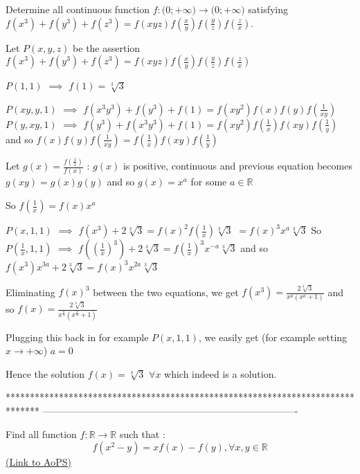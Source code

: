 \begin{solution}
	\begin{tcolorbox}Determine all continuous function ${{f: \mathbb(0;+\infty)}\to\mathbb(0;+\infty)}$ satisfying $f(x^3)+f(y^3)+f(z^3)=f(xyz)f(\frac{x}{y})f(\frac{y}{z})f(\frac{z}{x})$.\end{tcolorbox}
Let $P(x,y,z)$ be the assertion $f(x^3)+f(y^3)+f(z^3)=f(xyz)f(\frac xy)f(\frac yz)f(\frac zx)$

$P(1,1)$ $\implies$ $f(1)=\sqrt[3]3$

$P(xy,y,1)$ $\implies$ $f(x^3y^3)+f(y^3)+f(1)=f(xy^2)f(x)f(y)f(\frac 1{xy})$
$P(y,xy,1)$ $\implies$ $f(y^3)+f(x^3y^3)+f(1)=f(xy^2)f(\frac 1x)f(xy)f(\frac 1y)$
and so $f(x)f(y)f(\frac 1{xy})=f(\frac 1x)f(xy)f(\frac 1y)$

Let $g(x)=\frac{f(\frac 1x)}{f(x)}$ : $g(x)$ is positive, continuous and previous equation becomes $g(xy)=g(x)g(y)$ and so $g(x)=x^a$ for some $a\in\mathbb R$

So $f(\frac 1x)=f(x)x^a$

$P(x,1,1)$ $\implies$ $f(x^3)+2\sqrt[3]3=f(x)^2f(\frac 1x)\sqrt[3]3$ $=f(x)^3x^a\sqrt[3]3$
So $P(\frac 1x,1,1)$ $\implies$ $f((\frac 1x)^3)+2\sqrt[3]3=f(\frac 1x)^3x^{-a}\sqrt[3]3$ and so $f(x^3)x^{3a}+2\sqrt[3]3=f(x)^3x^{2a}\sqrt[3]3$

Eliminating $f(x)^3$ between the two equations, we get $f(x^3)=\frac{2\sqrt[3]3}{x^a(x^a+1)}$ and so $f(x)=\frac{2\sqrt[3]3}{x^{\frac a3}(x^{\frac a3}+1)}$

Plugging this back in for example $P(x,1,1)$, we easily get (for example setting $x\to +\infty$) $a=0$

Hence the solution $\boxed{f(x)=\sqrt[3]3}$ $\forall x$ which indeed is a solution.
\end{solution}
*******************************************************************************
-------------------------------------------------------------------------------

\begin{problem}
	Find all function $f:\mathbb{R}\rightarrow \mathbb{R}$ such that :
\[f\left ( x^2-y \right )=xf(x)-f(y), \forall x,y \in \mathbb{R}\]
	\flushright \href{https://artofproblemsolving.com/community/c6h531794}{(Link to AoPS)}
\end{problem}



